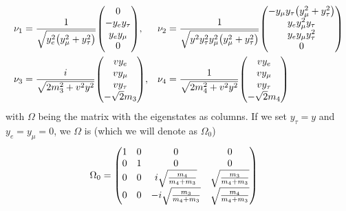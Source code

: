 \begin{align}
	\nu_{1} & = \frac{1}{\sqrt{y^{2}_{e}\qty(y^{2}_{\mu} + y^{2}_{\tau})}}
	\mqty(0                                                                               \\
	-y_{e}y_{\tau}                                                                        \\
	y_{e}y_{\mu}                                                                          \\
	0),     &
	\nu_{2} & = \frac{1}{\sqrt{y^{2}y_{\tau}^2y_{\mu}^{2}\qty(y_{\mu}^{2}+y_{\tau}^{2})}}
	\mqty(
	-y_{\mu}y_{\tau}\qty(y_{\mu}^{2}+y_{\tau}^{2})                                        \\
	y_{e}y^{2}_{\mu}y_{\tau}                                                              \\
	y_{e}y_{\mu}y^{2}_{\tau}                                                              \\
	0)                                                                                    \\
	\nu_{3} & = \frac{i}{\sqrt{2m^{2}_{3} + v^2y^2}}
	\mqty(
	v y_{e}                                                                               \\
	v y_{\mu}                                                                             \\
	v y_{\tau}                                                                            \\
	-\sqrt{2}m_{3}
	),      &
	\nu_{4} & = \frac{1}{\sqrt{2m^{2}_{4} + v^2y^2}}
	\mqty(
	v y_{e}                                                                               \\
	v y_{\mu}                                                                             \\
	v y_{\tau}                                                                            \\
	-\sqrt{2}m_{4}
	)
\end{align}
with \(\Omega\) being the matrix with the eigenstates as columns. If we set
\(y_{\tau} = y\) and \(y_{e}=y_{\mu}=0\), we \(\Omega\) is (which we will denote
as \(\Omega_{0}\))
\begin{align}
	\Omega_{0}
	  & =
	\mqty(
	1 & 0 & 0                            & 0                           \\
	0 & 1 & 0                            & 0                           \\
	0 & 0 & i\sqrt{\frac{m_4}{m_4+m_3}}  & \sqrt{\frac{m_3}{m_4+m_3}}  \\
	0 & 0 & -i\sqrt{\frac{m_3}{m_4+m_3}} & \sqrt{\frac{m_4}{m_4+m_3}})
\end{align}
